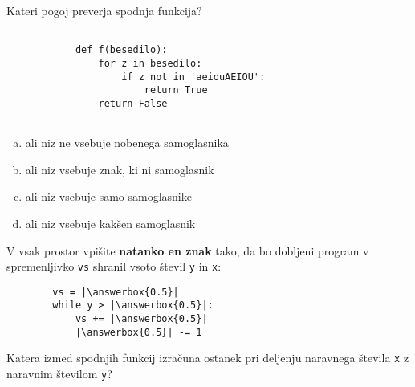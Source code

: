 \documentclass[arhiv, 10pt]{../izpit}
\newcommand{\inlinepy}[1]{\texttt{#1}}
\newcommand{\answerbox}[1]{\framebox{\vphantom{\large M}\hspace{#1cm}}}
\begin{document}
        \naloga*

        \begin{multicols}{2}
        \noindent
        Kateri pogoj preverja spodnja funkcija?
        \begin{verbatim}
        
            def f(besedilo):
                for z in besedilo:
                    if z not in 'aeiouAEIOU':
                        return True
                return False
            
        \end{verbatim}

        \begin{enumerate}[(a)]
\item ali niz ne vsebuje nobenega samoglasnika
\item ali niz vsebuje znak, ki ni samoglasnik
\item ali niz vsebuje samo samoglasnike
\item ali niz vsebuje kakšen samoglasnik
\end{enumerate}

        \end{multicols}
    
        \naloga*
        \begin{multicols}{2}
        \noindent
        V vsak prostor vpišite \textbf{natanko en znak} tako, da bo dobljeni program v spremenljivko \inlinepy{vs} shranil vsoto števil \inlinepy{y} in \inlinepy{x}:
        
        \columnbreak
        \begin{verbatim}
        vs = |\answerbox{0.5}|
        while y > |\answerbox{0.5}|:
            vs += |\answerbox{0.5}|
            |\answerbox{0.5}| -= 1
        \end{verbatim}
        \end{multicols}
    
        \clearpage
        \naloga
        
        Katera izmed spodnjih funkcij izračuna ostanek pri deljenju naravnega števila \inlinepy{x} z naravnim številom \inlinepy{y}?
    
\end{document}
